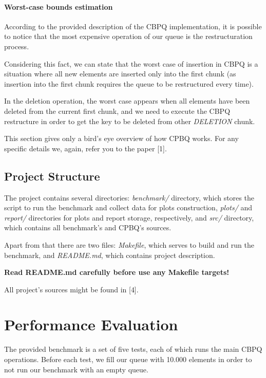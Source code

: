 \documentclass{article}
\begin{document}
\paragraph{Worst-case bounds estimation}\mbox{}\par 

According to the provided description of the CBPQ implementation, it is possible to notice that the most expensive operation of our queue is the restructuration process.\par

Considering this fact, we can state that the worst case of insertion in CBPQ is a situation where all new elements are inserted only into the first chunk (as insertion into the first chunk requires the queue to be restructured every time).\par

In the deletion operation, the worst case appears when all elements have been deleted from the current first chunk, and we need to execute the CBPQ restructure in order to get the key to be deleted from other \emph{DELETION} chunk.\newline\par

This section gives only a bird's eye overview of how CPBQ works. For any specific details we, again, refer you to the paper [1].

\subsection{Project Structure}

The project contains several directories: \textit{benchmark/} directory, which stores the script to run the benchmark and collect data for plots construction, \textit{plots/} and \textit{report/} directories for plots and report storage, respectively, and \textit{src/} directory, which contains all benchmark's and CPBQ's sources.\par

Apart from that there are two files: \textit{Makefile}, which serves to build and run the benchmark, and \textit{README.md}, which contains project description.\par

\textbf{Read README.md carefully before use any Makefile targets!}\par
All project's sources might be found in [4].

\section{Performance Evaluation}
The provided benchmark is a set of five tests, each of which runs the main CBPQ operations. Before each test, we fill our queue with 10.000 elements in order to not run our benchmark with an empty queue.\par
\end{document}
